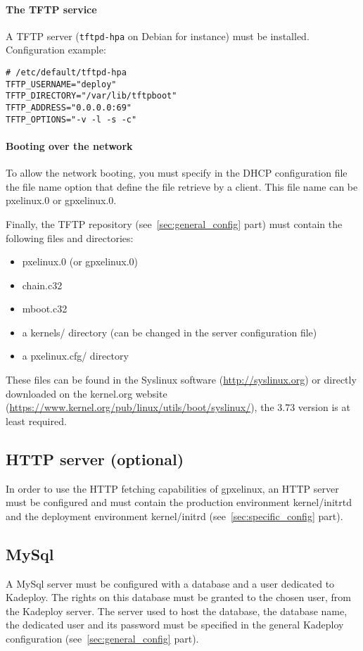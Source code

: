 \documentclass[a4wide,10pt,oneside]{book}
\begin{document}
\paragraph{The TFTP service\\}
A TFTP server (\texttt{tftpd-hpa} on Debian for instance) must be installed. Configuration example:
\begin{verbatim}
# /etc/default/tftpd-hpa
TFTP_USERNAME="deploy"
TFTP_DIRECTORY="/var/lib/tftpboot"
TFTP_ADDRESS="0.0.0.0:69"
TFTP_OPTIONS="-v -l -s -c"
\end{verbatim}

\paragraph{Booting over the network\\}
To allow the network booting, you must specify in the DHCP configuration file the file name option that define the file retrieve by a client. This file name can be pxelinux.0 or gpxelinux.0.

Finally, the TFTP repository (see~\ref{sec:general_config} part) must contain the following files and directories:
\begin{itemize}
 \item pxelinux.0 (or gpxelinux.0)
 \item chain.c32
 \item mboot.c32
 \item a kernels/ directory (can be changed in the server configuration file)
 \item a pxelinux.cfg/ directory
\end{itemize}
These files can be found in the Syslinux software (\url{http://syslinux.org}) or directly downloaded on the kernel.org website (\url{https://www.kernel.org/pub/linux/utils/boot/syslinux/}), the 3.73 version is at least required.

\subsection{HTTP server (optional)}
In order to use the HTTP fetching capabilities of gpxelinux, an HTTP server must be configured and must contain the production environment kernel/initrtd and the deployment environment kernel/initrd (see~\ref{sec:specific_config} part).

\subsection{MySql}
A MySql server must be configured with a database and a user dedicated to Kadeploy. The rights on this database must be granted to the chosen user, from the Kadeploy server. The server used to host the database, the database name, the dedicated user and its password must be specified in the general Kadeploy configuration (see~\ref{sec:general_config} part).
\end{document}

